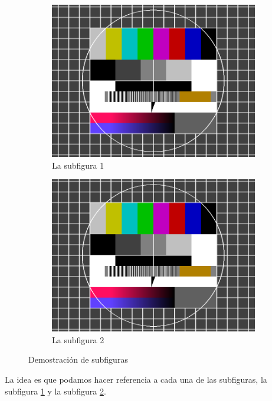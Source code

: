 \begin{figure}[htb]
    \begin{subfigure}[b]{0.45\linewidth}
        \centering
        \includegraphics[width=0.85\linewidth]{content/images/testimage.png}
        \caption{La subfigura 1}
        \label{fig:subfiguras:a}
    \end{subfigure}
    \begin{subfigure}[b]{0.45\linewidth}
        \centering
        \includegraphics[width=0.85\linewidth]{content/images/testimage.png}
        \caption{La subfigura 2}
        \label{fig:subfiguras:b}
    \end{subfigure}
    \caption{Demostración de subfiguras}
    \label{fig:subfiguras}
\end{figure}

La idea es que podamos hacer referencia a cada una de las subfiguras, la subfigura \ref{fig:subfiguras:a} y la subfigura \ref{fig:subfiguras:b}.